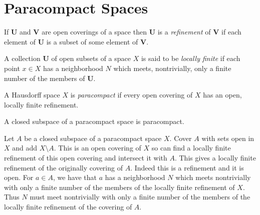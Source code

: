 \documentclass[letterpaper, 11pt, oneside]{book}
\begin{document}
\clearpage


\chapter{Paracompact Spaces}

\begin{defn}[Refinement]
  If \textbf{U} and \textbf{V} are open coverings of a space then \textbf{U} is a \emph{refinement} of \textbf{V} if each element of \textbf{U} is a subset of some element of \textbf{V}.
\end{defn}

\begin{defn}
  A collection \textbf{U} of open subsets of a space $X$ is said to be \emph{locally finite} if each point $x \in X$ has a neighborhood $N$ which meets, nontrivially, only a finite number of the members of \textbf{U}.
\end{defn}

\begin{defn}[Paracompactness]
  A Hausdorff space $X$ is \emph{paracompact} if every open covering of $X$ has an open, locally finite refinement.
\end{defn}

\begin{prop}
  A closed subspace of a paracompact space is paracompact.
\end{prop}
\begin{pf}
  Let $A$ be a closed subspace of a paracompact space $X$.
  Cover $A$ with sets open in $X$ and add $X \setminus A$.
  This is an open covering of $X$ so can find a locally finite refinement of this open covering and intersect it with $A$.
  This gives a locally finite refinement of the originally covering of $A$.
  Indeed this is a refinement and it is open.
  For $a \in A$, we have that $a$ has a neighborhood $N$ which meets nontrivially with only a finite number of the members of the locally finite refinement of $X$.
  Thus $N$ must meet nontrivially with only a finite number of the members of the locally finite refinement of the covering of $A$.
\end{pf}

\clearpage
\end{document}
